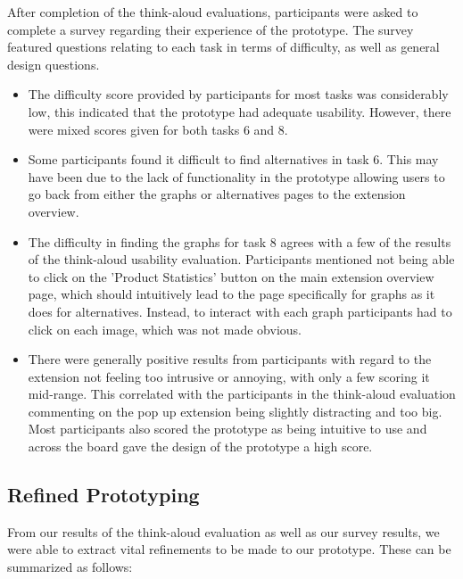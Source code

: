 \documentclass[a4,10pt,twocolumn]{article}
\begin{document}
After completion of the think-aloud evaluations, participants were asked to complete a survey regarding their experience of the prototype. The survey featured questions relating to each task in terms of difficulty, as well as general design questions.

\begin{itemize}
    \item The difficulty score provided by participants for most tasks was considerably low, this indicated that the prototype had adequate usability. However, there were mixed scores given for both tasks 6 and 8.
    \item Some participants found it difficult to find alternatives in task 6. This may have been due to the lack of functionality in the prototype allowing users to go back from either the graphs or alternatives pages to the extension overview.
    \item The difficulty in finding the graphs for task 8 agrees with a few of the results of the think-aloud usability evaluation. Participants mentioned not being able to click on the 'Product Statistics' button on the main extension overview page, which should intuitively lead to the page specifically for graphs as it does for alternatives. Instead, to interact with each graph participants had to click on each image, which was not made obvious.
    \item There were generally positive results from participants with regard to the extension not feeling too intrusive or annoying, with only a few scoring it mid-range. This correlated with the participants in the think-aloud evaluation commenting on the pop up extension being slightly distracting and too big. Most participants also scored the prototype as being intuitive to use and across the board gave the design of the prototype a high score.
\end{itemize}

\subsection*{Refined Prototyping}
From our results of the think-aloud evaluation as well as our survey results, we were able to extract vital refinements to be made to our prototype. These can be summarized as follows:
\end{document}
